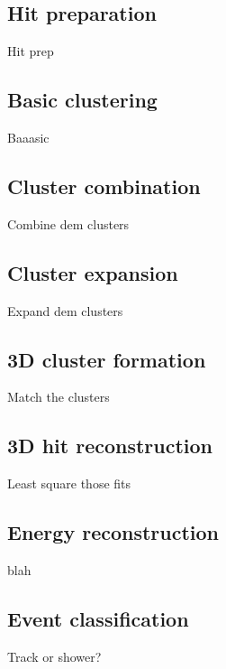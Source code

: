 \subsection{Hit preparation}
\label{subsec:ECalHitPerparation}
Hit prep

\subsection{Basic clustering}
\label{subsec:ECalBasicClustering}
Baaasic

\subsection{Cluster combination}
\label{subsec:ECalCombineClusters}
Combine dem clusters

\subsection{Cluster expansion}
\label{subsec:ECalExpandClusters}
Expand dem clusters

\subsection{3D cluster formation}
\label{subsec:ECal3DMatching}
Match the clusters

\subsection{3D hit reconstruction}
\label{subsec:ECal3DHitReconstruction}
Least square those fits

\subsection{Energy reconstruction}
\label{subsec:ECalEnergyReconstruction}
blah

\subsection{Event classification}
\label{subsec:ECalParticleIdentification}
Track or shower?
